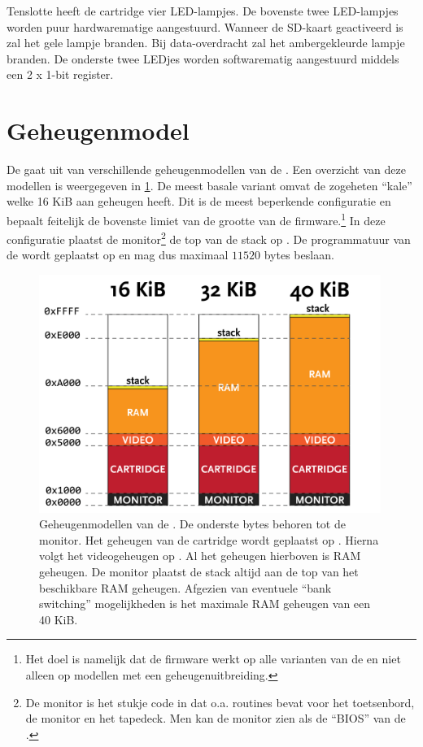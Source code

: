 Tenslotte heeft de  cartridge vier LED-lampjes. De bovenste twee LED-lampjes worden puur hardwarematige aangestuurd. Wanneer de SD-kaart geactiveerd is zal het gele lampje branden. Bij data-overdracht zal het ambergekleurde lampje branden. De onderste twee LEDjes worden softwarematig aangestuurd middels een 2 x 1-bit register.

%
%
%
\section{Geheugenmodel}
\label{sec:memory-model}


De \product gaat uit van verschillende geheugenmodellen van de . Een overzicht van deze modellen is weergegeven in \cref{fig:memory-models}. De meest basale variant omvat de zogeheten ``kale''  welke 16 KiB aan geheugen heeft. Dit is de meest beperkende configuratie en bepaalt feitelijk de bovenste limiet van de grootte van de firmware.\footnote{Het doel is namelijk dat de firmware werkt op alle varianten van de  en niet alleen op modellen met een geheugenuitbreiding.} In deze configuratie plaatst de monitor\footnote{De monitor is het stukje code in  dat o.a. routines bevat voor het toetsenbord, de monitor en het tapedeck. Men kan de monitor zien als de ``BIOS'' van de .} de top van de stack op . De programmatuur van de \product wordt geplaatst op  en mag dus maximaal $11520$ bytes beslaan.

\begin{figure}[h!]
    \centering
    \includegraphics[width=0.99\textwidth]{img/memory_models.png}
    \caption{Geheugenmodellen van de . De onderste  bytes behoren tot de monitor. Het geheugen van de  cartridge wordt geplaatst op . Hierna volgt het videogeheugen op . Al het geheugen hierboven is RAM geheugen. De monitor plaatst de stack altijd aan de top van het beschikbare RAM geheugen. Afgezien van eventuele ``bank switching'' mogelijkheden is het maximale RAM geheugen van een  40 KiB.}
    \label{fig:memory-models}
\end{figure}

